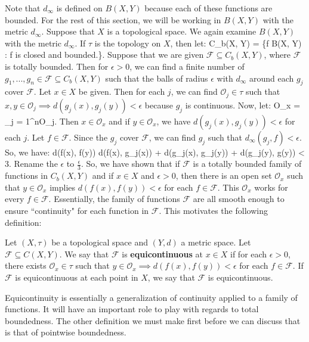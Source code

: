 	Note that $d_\infty$ is defined on $B(X, Y)$ because each of these functions are bounded. For the rest of this section, 
	we will be working in $B(X, Y)$ with the metric $d_\infty$. Suppose that $X$ is a topological space. We again examine 
	$B(X, Y)$ with the metric $d_\infty$. If $\tau$ is the topology on $X$, then let:
	\eq
		C_b(X, Y) = \{f \in B(X, Y) : f \textnormal{ is closed and bounded.}\}.
	\qe
	Suppose that we are given $\mathcal F\subseteq C_b(X, Y)$, where $\mathcal F$ is totally bounded. Then for $\epsilon 
	> 0$, we can find a finite number of $g_1, ..., g_n\in \mathcal F\subseteq C_b(X, Y)$ such that the balls of radius 
	$\epsilon$ with $d_\infty$ around each $g_j$ cover $\mathcal F$. Let $x\in X$ be given. Then for each $j$, we 
	can find $\mathcal O_j\in\tau$ such that $x, y\in\mathcal O_j\implies d(g_j(x), g_j(y)) < \epsilon$ because $g_j$ is 
	continuous. Now, let:
	\eq
		\mathcal O_x = \bigcap_{j = 1}^n\mathcal O_j\in\tau.
	\qe
	Then $x\in \mathcal O_x$ and if $y\in\mathcal O_x$, we have $d(g_j(x), g_j(y)) < \epsilon$ for each $j$. Let $f\in
	\mathcal F$. Since the $g_j$ cover $\mathcal F$, we can find $g_j$ such that $d_\infty(g_j, f) < \epsilon$. So, we 
	have:
	\eq
		d(f(x), f(y)) \leq d(f(x), g_j(x)) + d(g_j(x), g_j(y)) + d(g_j(y), g(y)) < 3\epsilon.
	\qe
	Rename the $\epsilon$ to $\frac{\epsilon}{3}$. So, we have shown that if $\mathcal F$ is a totally bounded family 
	of functions in $C_b(X, Y)$ and if $x\in X$ and $\epsilon > 0$, then there is an open set $\mathcal O_x$ such 
	that $y\in \mathcal O_x$ implies $d(f(x), f(y)) < \epsilon$ for each $f\in\mathcal F$. This $\mathcal O_x$ works for 
	every $f\in\mathcal F$. Essentially, the family of functions $\mathcal F$ are all smooth enough to ensure ``continuity" 
	for each function in $\mathcal F$. This motivates the following definition:
	
	\begin{definition}[Equicontinuity]
		Let $(X, \tau)$ be a topological space and $(Y, d)$ a metric space. Let $\mathcal F\subseteq C(X, Y)$. We say that 
		$\mathcal F$ is \textbf{equicontinuous} at $x\in X$ if for each $\epsilon > 0$, there exists $\mathcal O_x\in\tau$ 
		such that $y\in\mathcal O_x\implies d(f(x), f(y)) < \epsilon$ for each $f\in\mathcal F$. If $\mathcal F$ is 
		equicontinuous at each point in $X$, we say that $\mathcal F$ is equicontinuous.
	\end{definition}
	
	Equicontinuity is essentially a generalization of continuity applied to a family of functions. It will have an important role to play with regards to total boundedness. The other definition we must make first before we can discuss that is that of pointwise boundedness.
	
